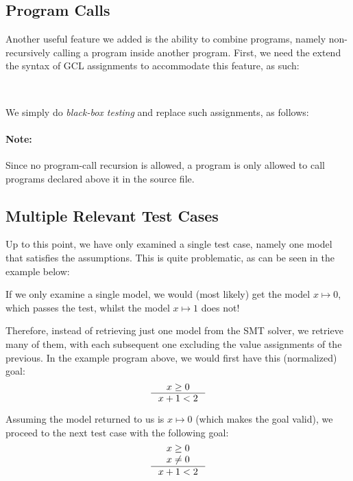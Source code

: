 \documentclass[nonatbib,numbers,10pt]{sigplanconf}
\newenvironment{bnfsplit}[1][0.7\textwidth]
 {\minipage[t]{#1}$}
 {$\endminipage}
\begin{document}

\subsection{Program Calls}
Another useful feature we added is the ability to combine programs, namely non-recursively calling a program inside another program. First, we need the extend the syntax of GCL assignments to accommodate this feature, as such:
\begin{bnf*}
\bnfprod{Stmt}{
\begin{bnfsplit}
	\bnfsk \\ \bnfor
	\bnfpn{Var*} \bnfsp \bnfts{:=} \bnfsp \bnfpn{Name} \bnfsp \bnfts{(}  \bnfpn{Expr*} \bnfsp \bnfts{)}
\end{bnfsplit}
}\\
\end{bnf*}

We simply do \textit{black-box testing} and replace such assignments, as follows:


\noindent
\paragraph{Note:}Since no program-call recursion is allowed, a program is only allowed to call programs declared above it in the source file.

\subsection{Multiple Relevant Test Cases}
Up to this point, we have only examined a single test case, namely one model that satisfies the assumptions. This is quite problematic, as can be seen in the example below:


If we only examine a single model, we would (most likely) get the model $x \mapsto 0$, which passes the test, whilst the model $x \mapsto 1$ does not!

Therefore, instead of retrieving just one model from the SMT solver, we retrieve many of them, with each subsequent one excluding the value assignments of the previous. In the example program above, we would first have this (normalized) goal:
\[ \inference {x \ge 0}{ x + 1 < 2} \]

Assuming the model returned to us is ${x \mapsto 0}$ (which makes the goal valid), we proceed to the next test case with the following goal:
\[ \inference {x \ge 0 \\ x \not= 0}{ x + 1 < 2} \]
\end{document}
